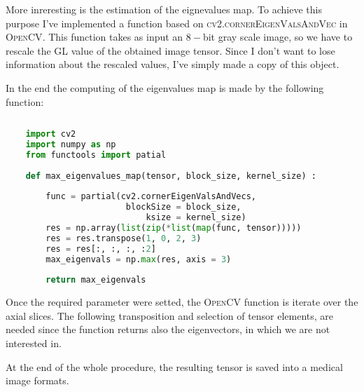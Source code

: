 \documentclass{standalone}
\begin{document}
	More inreresting is the estimation of the eignevalues map. To achieve this purpose I've implemented a function based on \textsc{cv2.cornerEigenValsAndVec} in \textsc{OpenCV}. This function takes as input an $8-$bit gray scale image, so we have to rescale the GL value of the obtained image tensor. Since I don't want to lose information about the rescaled values, I've simply made a copy of this object. 
	
	In the end the computing of the eigenvalues map is made by the following function: 
		\lstset{style=python}
	\begin{lstlisting}[language=python, caption=HU registration function, label=code:saf]
		
	import cv2
	import numpy as np
	from functools import patial
		
	def max_eigenvalues_map(tensor, block_size, kernel_size) :
		
		func = partial(cv2.cornerEigenValsAndVecs, 
						blockSize = block_size, 
							ksize = kernel_size)
		res = np.array(list(zip(*list(map(func, tensor)))))
		res = res.transpose(1, 0, 2, 3)
		res = res[:, :, :, :2]
		max_eigenvals = np.max(res, axis = 3)
	
		return max_eigenvals

	\end{lstlisting}

	Once the required parameter were setted, the \textsc{OpenCV} function is iterate over the axial slices. The following transposition and selection of tensor elements, are needed since the function returns also the eigenvectors, in which we are not interested in. 
	
	At the end of the whole procedure, the resulting tensor is saved into a medical image formats. 
	
	
\end{document}
